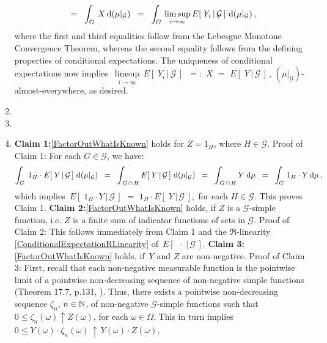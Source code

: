 \begin{enumerate}
\begin{equation*}
	\;\;=\;\;
	\int_{G}\,X\,\textnormal{d}(\mu\vert_{\mathcal{G}})
	\;\;=\;\;
	\int_{G}\,\underset{i\rightarrow\infty}{\limsup}\,E\!\left[\;Y_{i}\,\vert\,\mathcal{G}\,\right]\,\textnormal{d}(\mu\vert_{\mathcal{G}})\,,
	\end{equation*}
	where the first and third equalities follow from the Lebesgue Monotone Convergence Theorem,
	whereas the second equality follows from the defining properties of conditional expectations.
	The uniqueness of conditional expectations now implies
	\,$\underset{i\rightarrow\infty}{\limsup}\,E\!\left[\;Y_{i}\,\vert\,\mathcal{G}\,\right]$
	\,$=:$ $X$ $=$ $E\!\left[\;Y\,\vert\,\mathcal{G}\,\right]$\,,
	$(\mu\vert_{\mathcal{G}})$-almost-everywhere, as desired.
\item
\item
\item
	\textbf{Claim 1:}\;\;\eqref{FactorOutWhatIsKnown} holds for $Z = 1_{H}$, where $H \in \mathcal{G}$.
	\vskip 0.0cm
	Proof of Claim 1: For each $G \in \mathcal{G}$, we have:
	\begin{equation*}
	\int_{G}\;1_{H} \cdot E\!\left[\;Y\,\vert\,\mathcal{G}\,\right]\,\textnormal{d}(\mu\vert_{\mathcal{G}})
	\;\; = \;\;
	\int_{\,G\,\cap\,H}E\!\left[\;Y\,\vert\,\mathcal{G}\,\right]\,\textnormal{d}(\mu\vert_{\mathcal{G}})
	\;\; = \;\;
	\int_{\,G\,\cap\,H} Y\;\textnormal{d}\mu
	\;\; = \;\;
	\int_{G}\,1_{H} \cdot Y\,\textnormal{d}\mu\,,
	\end{equation*}
	which implies \,$E\!\left[\;1_{H}\cdot Y\,\vert\,\mathcal{G}\,\right]$
	$=$ $1_{H}\cdot E\!\left[\;Y\,\vert\,\mathcal{G}\,\right]$,\,
	for each $H \in \mathcal{G}$.
	This proves Claim 1.
	\vskip 0.4cm
	\textbf{Claim 2:}\;\;\eqref{FactorOutWhatIsKnown} holds, if $Z$ is a $\mathcal{G}$-simple function,
	i.e. $Z$ is a finite sum of indicator functions of sets in $\mathcal{G}$.
	\vskip 0.0cm
	Proof of Claim 2: This follows immediately from Claim 1 and
	the $\Re$-linearity \eqref{ConditionalExpectationRLinearity} of \,$E\!\left[\;\,\cdot\;\vert\,\mathcal{G}\,\right]$.
	\vskip 0.4cm
	\textbf{Claim 3:}\;\;\eqref{FactorOutWhatIsKnown} holds, if \,$Y$ and $Z$ are non-negative.
	\vskip 0.0cm
	Proof of Claim 3: First, recall that each non-negative measurable function is the pointwise limit
	of a pointwise non-decreasing sequence of non-negative simple functions (Theorem 17.7, p.131, \cite{Aliprantis1998}).
	Thus, there exists a pointwise non-decreasing sequence $\zeta_{n}$, $n \in \mathbb{N}$, of non-negative
	$\mathcal{G}$-simple functions such that $0 \leq \zeta_{n}(\omega) \uparrow Z(\omega)$, for each $\omega \in \Omega$.
	This in turn implies
	\,$0 \leq Y(\omega) \cdot \zeta_{n}(\omega) \,\uparrow\, Y(\omega) \cdot Z(\omega)$,\,

\end{enumerate}
